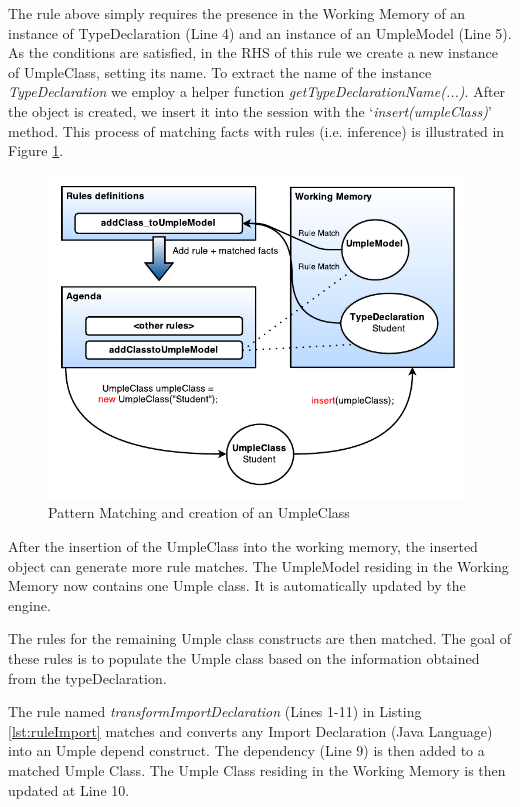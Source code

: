 The rule above simply requires the presence in the Working Memory of an instance of TypeDeclaration (Line 4) and an instance of an UmpleModel (Line 5). As the conditions are satisfied, in the RHS of this rule we create a new instance of UmpleClass, setting its name. To extract the name of the instance \textit{TypeDeclaration} we employ a helper function \textit{getTypeDeclarationName(...)}. After the object is created, we insert it into the session with the `\textit{insert(umpleClass)}' method. This process of matching facts with rules (i.e. inference) is illustrated in Figure \ref{fig:ruleModel}.

\begin{figure}[h]
\centering
\includegraphics[width=0.98\textwidth]{Figures/ruleModel.pdf}
\caption{Pattern Matching and creation of an UmpleClass}
\label{fig:ruleModel}
\end{figure}

After the insertion of the UmpleClass into the working memory, the inserted object can generate more rule matches. The UmpleModel residing in the Working Memory now contains one Umple class. It is automatically updated by the engine.

The rules for the remaining Umple class constructs are then matched. The goal of these rules is to populate the Umple class based on the information obtained from the typeDeclaration. 

The rule named \textit{transformImportDeclaration} (Lines 1-11) in Listing \ref{lst:ruleImport} matches and converts any Import Declaration (Java Language) into an Umple depend construct. The dependency (Line 9) is then added to a matched Umple Class. The Umple Class residing in the Working Memory is then updated at Line 10.

